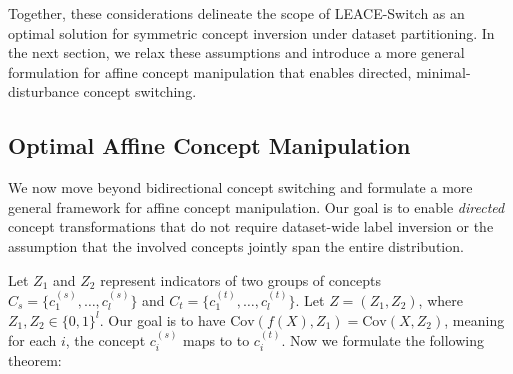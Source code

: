 \documentclass{article}
\theoremstyle{plain}
\theoremstyle{definition}
\theoremstyle{remark}
\newcommand{\cov}{\mathrm{Cov}}
\begin{document}
Together, these considerations delineate the scope of LEACE-Switch as an optimal solution for symmetric concept inversion under dataset partitioning. In the next section, we relax these assumptions and introduce a more general formulation for affine concept manipulation that enables directed, minimal-disturbance concept switching.

\subsection{Optimal Affine Concept Manipulation}
We now move beyond bidirectional concept switching and formulate a more general framework for affine concept manipulation. Our goal is to enable \emph{directed} concept transformations that do not require dataset-wide label inversion or the assumption that the involved concepts jointly span the entire distribution.

 Let $Z_1$ and $Z_2$ represent indicators of two groups of concepts $C_s = \{c^{(s)}_1, \dots, c^{(s)}_l\}$ and $C_t = \{c^{(t)}_1, \dots, c^{(t)}_l\}$.
 Let $Z = (Z_1, Z_2)$, where $Z_1, Z_2 \in \{0, 1\}^{l}$.
 Our goal is to have $\cov(f(X), Z_1) = \cov(X, Z_2)$, meaning for each $i$, the concept $c^{(s)}_i$ maps to to $c^{(t)}_i$. 
 Now we formulate the following theorem:
\end{document}
